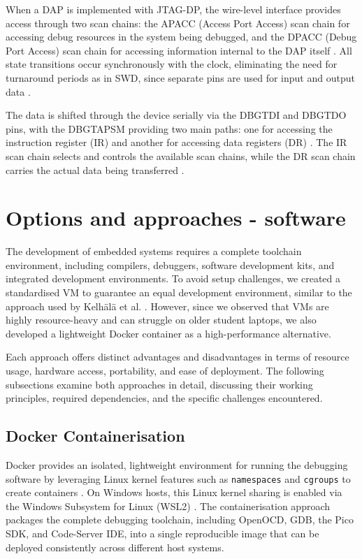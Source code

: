 When a DAP is implemented with JTAG-DP, the wire-level interface provides access through two scan chains: the APACC (Access Port Access) scan chain for accessing debug resources in the system being debugged, and the DPACC (Debug Port Access) scan chain for accessing information internal to the DAP itself \cite{adi}. All state transitions occur synchronously with the clock, eliminating the need for turnaround periods as in SWD, since separate pins are used for input and output data \cite{adi}.

The data is shifted through the device serially via the DBGTDI and DBGTDO pins, with the DBGTAPSM providing two main paths: one for accessing the instruction register (IR) and another for accessing data registers (DR) \cite{adi}. The IR scan chain selects and controls the available scan chains, while the DR scan chain carries the actual data being transferred \cite{adi}.

\section{Options and approaches - software}

The development of embedded systems requires a complete toolchain environment, including compilers, debuggers, software development kits, and integrated development environments. To avoid setup challenges, we created a standardised VM to guarantee an equal development environment, similar to the approach used by Kelhälä et al. \cite{kelhala:2024}. However, since we observed that VMs are highly resource-heavy and can struggle on older student laptops, we also developed a lightweight Docker container as a high-performance alternative.

Each approach offers distinct advantages and disadvantages in terms of resource usage, hardware access, portability, and ease of deployment. The following subsections examine both approaches in detail, discussing their working principles, required dependencies, and the specific challenges encountered.

\subsection{Docker Containerisation}

Docker provides an isolated, lightweight environment for running the debugging software by leveraging Linux kernel features such as \texttt{namespaces} and \texttt{cgroups} to create containers \cite{rosen_namespaces_slides}. On Windows hosts, this Linux kernel sharing is enabled via the Windows Subsystem for Linux (WSL2) \cite{docker_wsl_docs}. The containerisation approach packages the complete debugging toolchain, including OpenOCD, GDB, the Pico SDK, and Code-Server IDE, into a single reproducible image that can be deployed consistently across different host systems.

